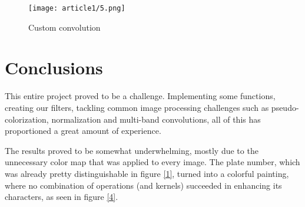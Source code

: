 \documentclass[11pt]{IEEEtran}
\begin{document}
\begin{figure}[h!]
    \centering
    \texttt{[image: article1/5.png]}
    \caption{Custom convolution}
    \label{5}
\end{figure}

\section{Conclusions}

This entire project proved to be a challenge. Implementing some functions, creating our filters, tackling common image processing challenges such as pseudo-colorization, normalization and multi-band convolutions, all of this has proportioned a great amount of experience.

The results proved to be somewhat underwhelming, mostly due to the unnecessary color map that was applied to every image. The plate number, which was already pretty distinguishable in figure \ref{1}, turned into a colorful painting, where no combination of operations (and kernels) succeeded in enhancing its characters, as seen in figure \ref{4}.




\end{document}
